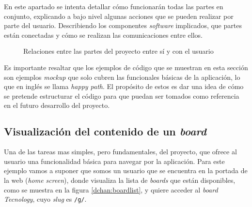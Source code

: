 \documentclass[12pt,a4paper,titlepage]{article}
\begin{document}





    En este apartado se intenta detallar cómo funcionarán todas las partes en conjunto, explicando a bajo nivel algunas acciones que se pueden realizar por parte del usuario. Describiendo los componentes \textit{software} implicados, que partes están conectadas y cómo se realizan las comunicaciones entre ellos.

    \begin{figure}[ht]
        \centering
        \caption{Relaciones entre las partes del proyecto entre sí y con el usuario}\bigskip
        \label{project:schema}
        \shorthandoff{>}\shorthandoff{<}
        \shorthandon{>}\shorthandon{<}
    \end{figure}

    Es importante resaltar que los ejemplos de código que se muestran en esta sección son ejemplos \textit{mockup} que solo cubren las funcionales básicas de la aplicación, lo que en inglés se llama \textit{happy path}. El propósito de estos es dar una idea de cómo se pretende estructurar el código para que puedan ser tomados como referencia en el futuro desarrollo del proyecto.

    \subsection{Visualización del contenido de un \textit{board}}

    Una de las tareas mas simples, pero fundamentales, del proyecto, que ofrece al usuario una funcionalidad básica para navegar por la aplicación. Para este ejemplo vamos a suponer que somos un usuario que se encuentra en la portada de la web (\textit{home screen}), donde visualiza la lista de \textit{boards} que están disponibles, como se muestra en la figura \ref{dchan:boardlist}, y quiere acceder al \textit{board} \textit{Tecnology}, cuyo \textit{slug} es \texttt{/g/}.
\end{document}
